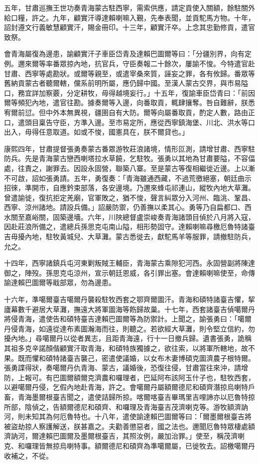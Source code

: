 \begin{pinyinscope}
五年，甘肅巡撫王世功奏青海蒙古駐西寧，需索供應，請定貢使入關額，餘駐關外給口糧，許之。九年，顧實汗導達賴喇嘛入覲，先奉表聞，並貢駝馬方物。十年，詔封遵文行義敏慧顧實汗，賜金冊印。十三年，顧實汗卒。上念其忠勤修貢，遣官致祭。

會青海屬復為邊患，諭顧實汗子車臣岱青及達賴巴圖爾等曰：「分疆別界，向有定例。邇來爾等率番眾掠內地，抗官兵，守臣奏報二十餘次，屢諭不悛。今特遣官赴甘肅、西寧等處勘狀。或爾等親至，或遣宰桑來質，誣妄之罪，各有攸歸。番眾等舊納貢蒙古者聽爾轄，儻系前明所屬，應仍歸中國。至漢人蒙古交界，與市易隘口，務宜詳加察覈，分定耕牧，毋得越境妄行。」十五年，復諭車臣岱青曰：「前因爾等頻犯內地，遣官往勘。據奏爾等入邊，向番取貢，輒肆攘奪。咎自難辭，朕悉宥爾前愆。但中外本無異視，疆圉自有大防。爾等向屬番取貢，酌定人數，路由正口，遣頭目稟告守臣，方準入邊。至市易定所，應從西寧鎮海堡、川北、洪水等口出入，毋得任意取道。如或不悛，國憲具在，朕不爾貸也。」

康熙四年，甘肅提督張勇奏蒙古番眾游牧莊浪諸境，情形叵測，請增甘肅、西寧駐防兵。先是青海蒙古戀西喇塔拉水草饒，乞駐牧。張勇以其地為甘肅要隘，不容偪處，往責之，謝罪去。因設永固營，聯築八寨。至是蒙古等復相繼徙近邊。上以漸不可啟，詔如張勇請。五年，勇復奏：「青海雖通西藏，不過荒徼絕塞，朝廷曲示招徠，準開市，自應鈐束部落，各安邊境。乃邇來蜂屯祁連山，縱牧內地大草灘。曾遣諭徙，復抗拒定羌廟，官軍敗之，猶不悛，聲言糾眾分入河州、臨洮、鞏昌、西寧、涼州諸地。請設兵備。」詔嚴防禦，仍善撫以柔其心。勇等乃自扁都口、西水關至嘉峪關，固築邊墻。六年，川陜總督盧崇峻奏青海諸頭目偵於八月將入寇，因赴莊浪所備之，遣總兵孫思克屯南山隘，相形勢固守。達賴喇嘛尋檄厄魯特諸臺吉毋擾內地，駐牧黃城兒、大草灘。蒙古悉徙去，獻駝馬羊等服罪，請撤駐防兵，允之。

十四年，西寧諸鎮兵屯河東剿叛賊王輔臣，青海蒙古乘隙犯河西。永固營副將陳達御之，陣歿。孫思克屯涼州，宣示朝廷恩威，各引罪出塞。會達賴喇嘛使至，命傳諭達賴巴圖爾等戢部眾，勿為邊患。

十六年，準噶爾臺吉噶爾丹襲殺駐牧西套之鄂齊爾圖汗。青海和碩特諸臺吉懼，挈廬幕數千避居大草灘，撫遠大將軍圖海等飭歸故巢。十七年，西套諸臺吉偵噶爾丹將侵青海，遣使告和碩特臺吉達賴巴圖爾等為防禦計。上聞之，諭張勇曰：「噶爾丹侵青海，如遠從達布素圖瀚海而往，則聽之。若欲經大草灘，則令堅立信約，勿擾內地。」尋噶爾丹以從者異志，且距青海遠，行十一日撤兵歸。遺書張勇，詭稱其祖多克辛諾顏偕顧實汗取青海，和碩特族獨據之，欲往索，以將軍所轄地，故不果。既而懼和碩特諸臺吉襲己，密遣使議婚，以女布木妻博碩克圖濟農子根特爾。張勇諜得狀，奏噶爾丹仇青海、蒙古，議婚後，恐復往侵，甘肅當往來沖，請增防，上報可。有巴圖爾額爾克濟農和囉理者，巴延阿布該阿玉什子也，駐牧西套，以避噶爾丹侵，乞假內地赴青海，許之。會噶爾丹屬額爾德尼和碩齊潛掠烏喇特戶畜，青海墨爾根臺吉聞之，遣使詰歸所掠。喀爾喀臺吉畢瑪里吉哩諦亦以厄魯特掠所部，陰偵之，告額爾德尼和碩齊、和囉理及青海臺吉茂濟喇克等。游牧額濟訥河，則未知其為何厄魯特也。十八年，遣使諭達賴巴圖爾等曰：「爾墨爾根臺吉將被盜劫掠人察護解送，朕甚嘉之。夫勸善懲惡者，國之法也。邇聞厄魯特眾棲處額濟訥河，爾達賴巴圖爾及墨爾根臺吉，其照汝例，嚴加治罪。」使至，稱茂濟喇克、和囉理皆無掠烏喇特事。額爾德尼和碩齊為準噶爾屬，已徙牧去。詔檄噶爾丹收補之，不從。


\end{pinyinscope}
